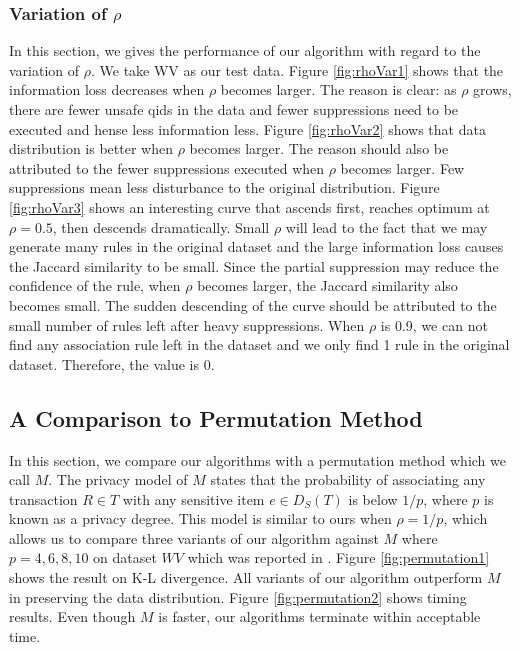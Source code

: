{\subsubsection{Variation of $\rho$}
In this section, we gives the performance of our algorithm with regard
to the variation of $\rho$. We take WV as our test data.
Figure \ref{fig:rhoVar1} shows that
the information loss decreases when $\rho$ becomes larger. The reason is
clear: as $\rho$ grows, there are fewer unsafe qids in the data and
fewer suppressions need to be executed and hense less information less.
Figure \ref{fig:rhoVar2} shows that data distribution
is better when $\rho$ becomes larger. The reason should also be attributed to
the fewer suppressions executed when $\rho$ becomes larger. Few suppressions mean
less disturbance to the original distribution.
Figure \ref{fig:rhoVar3} shows an interesting curve that ascends first,
reaches optimum at $\rho=0.5$,
then descends dramatically.
Small $\rho$ will lead to the fact that we may generate many rules in
the original dataset and the large information loss
causes the Jaccard similarity to be small. Since the partial suppression
may reduce the confidence of the rule, when $\rho$ becomes larger,
the Jaccard similarity also becomes small.
The sudden descending of the curve should be attributed to
the small number of rules left after heavy suppressions.
When $\rho$ is 0.9, we can not find any
association rule left in the dataset and we only find 1 rule in the
original dataset. Therefore, the value is 0.
}%

\subsection{A Comparison to Permutation Method}
In this section, we compare our algorithms with a permutation method
\cite{2011:TKDE:Anonymous}
which we call $M$.
The privacy model of $M$
states that the probability of associating any transaction $R \in T$ with
any sensitive item $e \in D_S(T)$ is below $1/p$, where $p$ is known as
a privacy degree. This model is similar to ours when $\rho = 1/p$,
which allows us to compare three variants of our algorithm against
$M$ where $p=4, 6, 8, 10$ on dataset $WV$ which was reported in
\cite{2011:TKDE:Anonymous}.
Figure \ref{fig:permutation1} shows the result on K-L divergence.
All variants of our algorithm outperform $M$ in
preserving the data distribution. 
Figure \ref{fig:permutation2} shows timing results.
Even though $M$ is faster, our algorithms
terminate within acceptable time.

